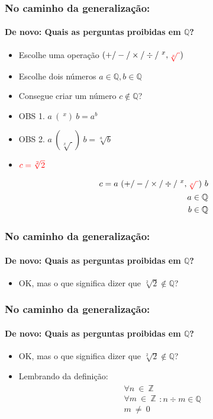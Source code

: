 \documentclass[usenames,dvipsnames,svgnames]{beamer}
\begin{document}
\begin{frame}	
	\frametitle{No caminho da generalização:}
	\framesubtitle{De novo: Quais as perguntas proibidas em $\mathbb{Q}$?}

	\begin{itemize}
		\item Escolhe uma operação $(+ / - / \times / \div / ~^x, {\color{red}\sqrt[x]{~}})$
		\item Escolhe dois números $a \in \mathbb{Q}, b \in \mathbb{Q}$
		\item Consegue criar um número $c \not \in \mathbb{Q}$?
		\item OBS 1. $a ~(~^x)~ b = a^b$
		\item OBS 2. $a ~(\sqrt[x]{~})~ b = \sqrt[a]{b}$
		\item ${\color{red}c = \sqrt[2]{2}}$
	\end{itemize}

	\begin{equation}
	\begin{aligned}
		c = a ~ (+ / - / \times / \div / ~^x, {\color{red}\sqrt[x]{~}}) ~ b \\
		a \in \mathbb{Q} \\
		b \in \mathbb{Q}
	\end{aligned}
	\end{equation}
\end{frame}

\begin{frame}	
	\frametitle{No caminho da generalização:}
	\framesubtitle{De novo: Quais as perguntas proibidas em $\mathbb{Q}$?}

	\begin{itemize}
		\item OK, mas o que significa dizer que $\sqrt[2]{2} \not\in \mathbb{Q}$?
	\end{itemize}
\end{frame}

\begin{frame}	
	\frametitle{No caminho da generalização:}
	\framesubtitle{De novo: Quais as perguntas proibidas em $\mathbb{Q}$?}

	\begin{itemize}
		\item OK, mas o que significa dizer que $\sqrt[2]{2} \not\in \mathbb{Q}$?
		\item Lembrando da definição:
		\begin{equation}
		\begin{aligned}
			\substack{\forall n ~\in~ \mathbb{Z} \\ \forall m ~\in~ \mathbb{Z} \\ m ~\neq~ 0}: n \div m \in \mathbb{Q}
		\end{aligned}
		\end{equation}
	\end{itemize}
\end{frame}
\end{document}
